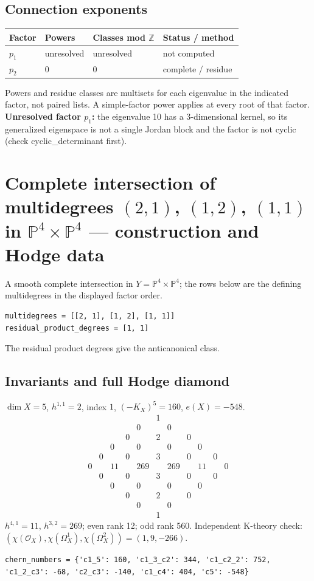 \documentclass[10pt,a4paper]{article}
\begin{document}
\subsection*{Connection exponents}
\begin{center}\begin{tabular}{llll}\toprule Factor & Powers & Classes mod $\mathbb Z$ & Status / method\\\midrule
$p_{1}$ & unresolved & unresolved & not computed\\
$p_{2}$ & $0$ & $0$ & complete / residue\\
\bottomrule\end{tabular}\end{center}
Powers and residue classes are multisets for each eigenvalue in the indicated factor, not paired lists. A simple-factor power applies at every root of that factor.
\textbf{Unresolved factor $p_{1}$:} the eigenvalue 10 has a 3-dimensional kernel, so its generalized eigenspace is not a single Jordan block and the factor is not cyclic (check cyclic\_determinant first).
\clearpage\section*{Complete intersection of multidegrees $(2,1)$, $(1,2)$, $(1,1)$ in $\mathbb P^{4}\times \mathbb P^{4}$ --- construction and Hodge data}\label{entry:PROD5-E02}
A smooth complete intersection in $Y=\mathbb P^{4}\times\mathbb P^{4}$; the rows below are the defining multidegrees in the displayed factor order.
\begin{lstlisting}
multidegrees = [[2, 1], [1, 2], [1, 1]]
residual_product_degrees = [1, 1]
\end{lstlisting}
The residual product degrees give the anticanonical class.
\subsection*{Invariants and full Hodge diamond}
$\dim X=5$, $h^{1,1}=2$, index $1$, $(-K_X)^5=160$, $e(X)=-548$.
\[\begin{array}{ccccccccccc}&&&&&1&&&&&\\&&&&0&&0&&&&\\&&&0&&2&&0&&&\\&&0&&0&&0&&0&&\\&0&&0&&3&&0&&0&\\0&&11&&269&&269&&11&&0\\&0&&0&&3&&0&&0&\\&&0&&0&&0&&0&&\\&&&0&&2&&0&&&\\&&&&0&&0&&&&\\&&&&&1&&&&&\end{array}\]
$h^{4,1}=11$, $h^{3,2}=269$; even rank 12; odd rank 560.
Independent K-theory check: $(\chi(\mathcal O_X),\chi(\Omega_X^1),\chi(\Omega_X^2))=(1, 9, -266)$.
\begin{lstlisting}
chern_numbers = {'c1_5': 160, 'c1_3_c2': 344, 'c1_c2_2': 752, 'c1_2_c3': -68, 'c2_c3': -140, 'c1_c4': 404, 'c5': -548}
\end{lstlisting}
\end{document}
